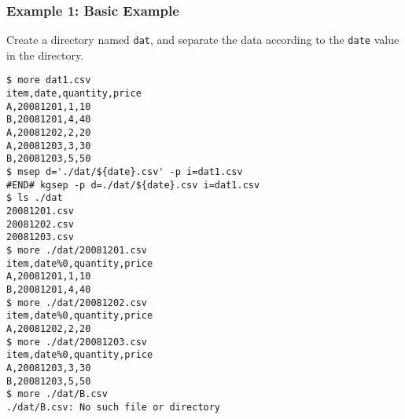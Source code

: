 \subsubsection*{Example 1: Basic Example}

Create a directory named \verb|dat|, and separate the data according to the \verb|date| value in the directory.


\begin{Verbatim}[baselinestretch=0.7,frame=single]
$ more dat1.csv
item,date,quantity,price
A,20081201,1,10
B,20081201,4,40
A,20081202,2,20
A,20081203,3,30
B,20081203,5,50
$ msep d='./dat/${date}.csv' -p i=dat1.csv
#END# kgsep -p d=./dat/${date}.csv i=dat1.csv
$ ls ./dat
20081201.csv
20081202.csv
20081203.csv
$ more ./dat/20081201.csv
item,date%0,quantity,price
A,20081201,1,10
B,20081201,4,40
$ more ./dat/20081202.csv
item,date%0,quantity,price
A,20081202,2,20
$ more ./dat/20081203.csv
item,date%0,quantity,price
A,20081203,3,30
B,20081203,5,50
$ more ./dat/B.csv
./dat/B.csv: No such file or directory
\end{Verbatim}
